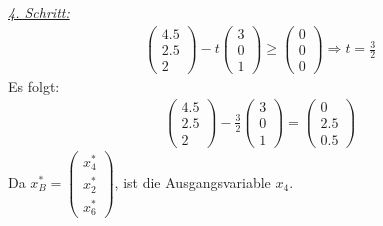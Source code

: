 \documentclass [a4paper,11pt]{article}
\begin{document}
\begin{enumerate}
\begin{enumerate}
            \underline{\textit{4. Schritt:}}\\
            \begin{align*}
                \begin{pmatrix}
                    4.5\\
                    2.5\\
                    2
                \end{pmatrix} - t
                \begin{pmatrix}
                    3\\ 0\\ 1
                \end{pmatrix} \geq
                \begin{pmatrix}
                    0\\ 0\\ 0
                \end{pmatrix} \Rightarrow
                t = \frac{3}{2}
            \end{align*}
            Es folgt:
            \begin{align*}
                \begin{pmatrix}
                    4.5\\
                    2.5\\
                    2
                \end{pmatrix} - \frac{3}{2}
                \begin{pmatrix}
                    3\\ 0\\ 1
                \end{pmatrix} =
                \begin{pmatrix}
                    0\\
                    2.5\\
                    0.5
                \end{pmatrix}
            \end{align*}
            Da $x_B^* = \begin{pmatrix} x_4^*\\ x_2^*\\ x_6^* \end{pmatrix}$, ist die Ausgangsvariable $x_4$.\\


\end{enumerate}
\end{enumerate}
\end{document}
